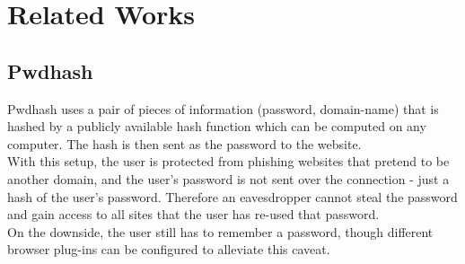 \documentclass[11pt]{article}
\begin{document}
\section{Related Works}
\subsection{Pwdhash} 
Pwdhash\cite{pwdhash} uses a pair of pieces of information (password, domain-name) that is hashed by a publicly available hash function which can be computed on any computer. The hash is then sent as the password to the website.\\
	With this setup, the user is protected from phishing websites that pretend to be another domain, and the user’s password is not sent over the connection - just a hash of the user's password. Therefore an eavesdropper cannot steal the password and gain access to all sites that the user has re-used that password.\\
	On the downside, the user still has to remember a password, though different browser plug-ins can be configured to alleviate this caveat.\\
\end{document}
